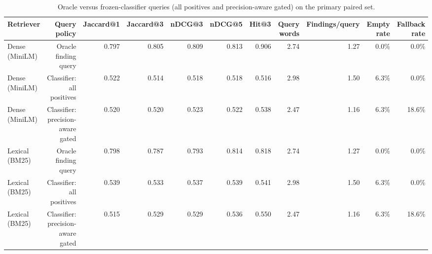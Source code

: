 \begin{table}[t]
\centering
\scriptsize
\begin{tabular}{lrrrrrrrrrr}
\hline
Retriever & Query policy & Jaccard@1 & Jaccard@3 & nDCG@3 & nDCG@5 & Hit@3 & Query words & Findings/query & Empty rate & Fallback rate \\
\hline
Dense (MiniLM) & Oracle finding query & 0.797 & 0.805 & 0.809 & 0.813 & 0.906 & 2.74 & 1.27 & 0.0\% & 0.0\% \\
Dense (MiniLM) & Classifier: all positives & 0.522 & 0.514 & 0.518 & 0.518 & 0.516 & 2.98 & 1.50 & 6.3\% & 0.0\% \\
Dense (MiniLM) & Classifier: precision-aware gated & 0.520 & 0.520 & 0.523 & 0.522 & 0.538 & 2.47 & 1.16 & 6.3\% & 18.6\% \\
Lexical (BM25) & Oracle finding query & 0.798 & 0.787 & 0.793 & 0.814 & 0.818 & 2.74 & 1.27 & 0.0\% & 0.0\% \\
Lexical (BM25) & Classifier: all positives & 0.539 & 0.533 & 0.537 & 0.539 & 0.541 & 2.98 & 1.50 & 6.3\% & 0.0\% \\
Lexical (BM25) & Classifier: precision-aware gated & 0.515 & 0.529 & 0.529 & 0.536 & 0.550 & 2.47 & 1.16 & 6.3\% & 18.6\% \\
\hline
\end{tabular}
\caption{Oracle versus frozen-classifier queries (all positives and precision-aware gated) on the primary paired set.}
\label{tab:table3_oracle_vs_classifier_queries}
\end{table}
